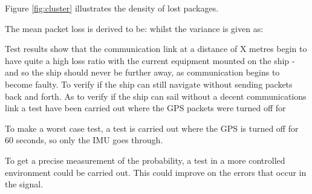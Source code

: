 Figure \vref{fig:cluster} illustrates the density of lost packages. 

The mean packet loss is derived to be: whilst the variance is given as: 

Test results show that the communication link at a distance of X metres begin to have quite a high loss ratio with the current equipment mounted on the ship - and so the ship should never be further away, as communication begins to become faulty. To verify if the ship can still navigate without sending packets back and forth. As to verify if the ship can sail without a decent communications link a test have been carried out where the GPS packets were turned off for 

To make a worst case test, a test is carried out where the GPS is turned off for 60 seconds, so only the IMU goes through. 

To get a precise measurement of the probability, a test in a more controlled environment could be carried out. This could improve on the errors that occur in the signal. 